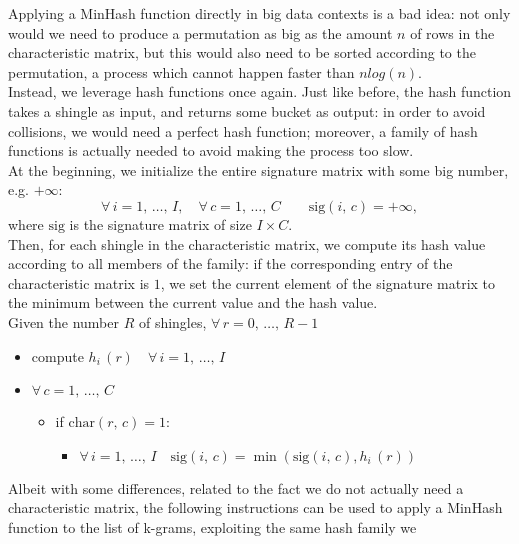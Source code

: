 \documentclass{article}
\begin{document}
  Applying a MinHash function directly in big data contexts is a bad idea: not
  only would we need to produce a permutation as big as the amount \( n \) of
  rows in the characteristic matrix, but this would also need to be sorted
  according to the permutation, a process which cannot happen faster than
  \( n log ( n ) \). \\
  Instead, we leverage hash functions once again. Just like before, the hash
  function takes a shingle as input, and returns some bucket as output: in
  order to avoid collisions, we would need a perfect hash function; moreover,
  a family of hash functions is actually needed to avoid making the process too
  slow. \\
  At the beginning, we initialize the entire signature matrix with some big
  number, e.g. \( + \infty \):
  \[
    \forall \, i = 1, \, \dots, \, I, \quad \forall \, c = 1, \, \dots, \, C
    \qquad \mathrm{ sig } ( i, \, c ) = + \infty \mathrm ,
  \]
  where \( \mathrm{ sig } \) is the signature matrix of size \( I \times C \).
  \\
  Then, for each shingle in the characteristic matrix, we compute its hash
  value according to all members of the family: if the corresponding entry of
  the characteristic matrix is \( 1 \), we set the current element of the
  signature matrix to the minimum between the current value and the hash value.
  \\
  Given the number \( R \) of shingles,
  \( \forall \, r = 0, \, \dots, \, R - 1 \)
  \begin{itemize}
    \item compute \( h_i \, ( r ) \quad \forall \, i = 1, \, \dots, \, I \)
    \item \( \forall \, c = 1, \, \dots, \, C \)
    \begin{itemize}
      \item[] if \( \mathrm{ char } ( r, \, c ) = 1 \):
      \begin{itemize}
        \item[] \( \forall \, i = 1, \, \dots, \, I \quad
        \mathrm{ sig } ( i, \, c ) =
        \min ( \mathrm{ sig } ( i, \, c ), h_i \, ( r ) ) \)
      \end{itemize}
    \end{itemize}
  \end{itemize}
  Albeit with some differences, related to the fact we do not actually need a
  characteristic matrix, the following instructions can be used to apply a
  MinHash function to the list of k-grams, exploiting the same hash family we
\end{document}
